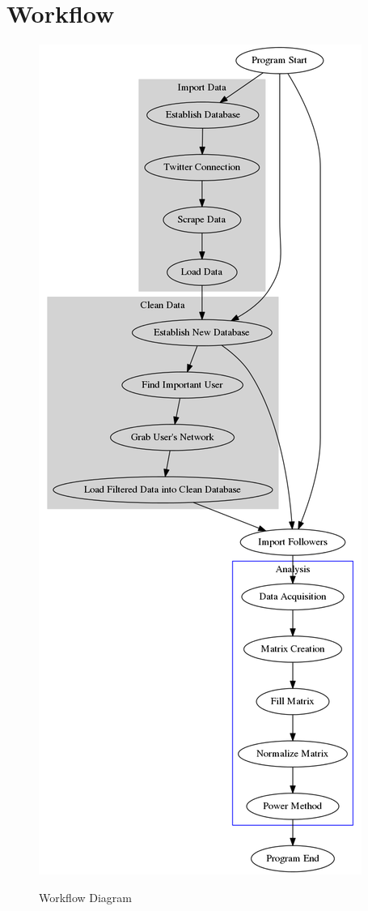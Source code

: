 \documentclass[10pt]{report}
\begin{document}
\appendix

\section{Workflow}\label{app:workflow}
    \begin{figure}[ht]
        \centering
        \includegraphics[scale=0.3]{./img/flow.png}
        \label{img:flow}
        \caption{Workflow Diagram}
    \end{figure}
\end{document}

